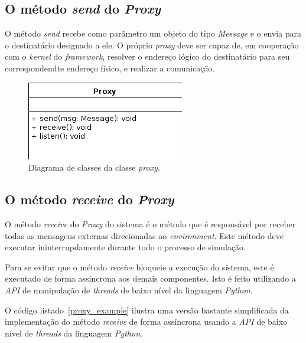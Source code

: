\subsection{O método \emph{send} do \emph{Proxy}}

O método \textit{send} recebe como parâmetro um objeto do tipo \textit{Message} e o envia para o destinatário designado a ele. O próprio \textit{proxy} deve ser capaz de, em cooperação com o \textit{kernel} do \textit{framework}, resolver o endereço lógico do destinatário para seu correspondendte endereço físico, e realizar a comunicação.


\begin{figure}
  \centerline{\includegraphics{uml_proxy_basico.png}}
  \caption{Diagrama de classes da classe \textit{proxy}.}
\label{fig:uml_proxy_basico}
\end{figure}

\subsection{O método \emph{receive} do \emph{Proxy}}

O método \textit{receive} do \textit{Proxy} do sistema é o método que é responsável por receber todas as mensagens externas direcionadas ao \textit{environment}. Este método deve executar ininterrupdamente durante todo o processo de simulação.

Para se evitar que o método \textit{receive} bloqueie a execução do sistema, este é executado de forma assíncrona aos demais componentes. Isto é feito utilizando a \textit{API} de manipulação de \textit{threads} de baixo nível da linguagem \textit{Python}.

O código listado~\ref{proxy_example} ilustra uma versão bastante simplificada da implementação do método \textit{receive} de forma assíncrona usando a \textit{API} de baixo nível de \textit{threads} da linguagem \textit{Python}.



